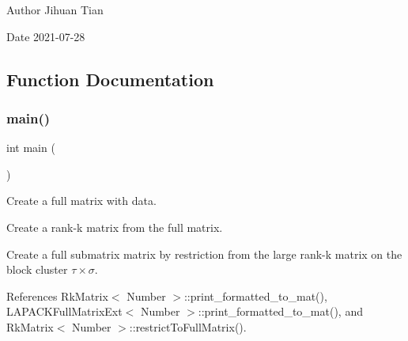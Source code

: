 \begin{DoxyAuthor}{Author}
Jihuan Tian 
\end{DoxyAuthor}
\begin{DoxyDate}{Date}
2021-\/07-\/28 
\end{DoxyDate}


\subsection{Function Documentation}
\mbox{\label{rkmatrix-global-to-submatrix_8cc_ae66f6b31b5ad750f1fe042a706a4e3d4}} 
\subsubsection{\texorpdfstring{main()}{main()}}
{\footnotesize\ttfamily int main (\begin{DoxyParamCaption}{ }\end{DoxyParamCaption})}

Create a full matrix with data.

Create a rank-\/k matrix from the full matrix.

Create a full submatrix matrix by restriction from the large rank-\/k matrix on the block cluster $\tau \times \sigma$.

References Rk\+Matrix$<$ Number $>$\+::print\+\_\+formatted\+\_\+to\+\_\+mat(), L\+A\+P\+A\+C\+K\+Full\+Matrix\+Ext$<$ Number $>$\+::print\+\_\+formatted\+\_\+to\+\_\+mat(), and Rk\+Matrix$<$ Number $>$\+::restrict\+To\+Full\+Matrix().

